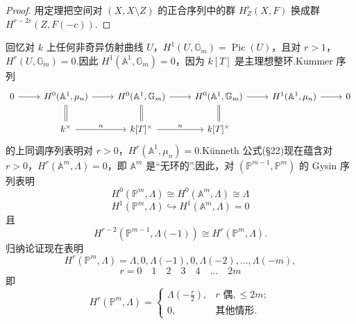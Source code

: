 \begin{proof}
用定理把空间对 $(X, X \setminus Z)$ 的正合序列中的群 $H^{r}_{Z}(X, F)$ 换成群 $H^{r-2c}(Z, F(-c))$.
\end{proof}

\begin{example}\label{ex:16.3}
回忆对 $k$ 上任何非奇异仿射曲线 $U$，$H^{1}(U, \mathbb{G}_{m}) = \operatorname{Pic}(U)$，且对 $r > 1$，$H^{r}(U, \mathbb{G}_{m}) = 0$.因此 $H^{1}(\mathbb{A}^{1}, \mathbb{G}_{m}) = 0$，因为 $k[T]$ 是主理想整环.Kummer 序列
\[
\begin{tikzcd}
0 \arrow[r] & H^{0}(\mathbb{A}^{1}, \mu_n) \arrow[r] \arrow[d, equal] & H^{0}(\mathbb{A}^{1}, \mathbb{G}_{m}) \arrow[r] \arrow[d, equal] & H^{0}(\mathbb{A}^{1}, \mathbb{G}_{m}) \arrow[r] \arrow[d, equal] & H^{1}(\mathbb{A}^{1}, \mu_n) \arrow[r] & 0 \\
& k^{\times} \arrow[r, "n"] & k[T]^{\times} \arrow[r, "n"] & k[T]^{\times} &
\end{tikzcd}
\]
的上同调序列表明对 $r > 0$，$H^{r}(\mathbb{A}^{1}, \mu_n) = 0$.K\"unneth 公式(\S 22)现在蕴含对 $r > 0$，$H^{r}(\mathbb{A}^{m}, \Lambda) = 0$，即 $\mathbb{A}^{m}$ 是``无环的''.因此，对 $(\mathbb{P}^{m-1}, \mathbb{P}^{m})$ 的 Gysin 序列表明
\[
H^{0}(\mathbb{P}^{m}, \Lambda) \cong H^{0}(\mathbb{A}^{m}, \Lambda) \cong \Lambda
\]
\[
H^{1}(\mathbb{P}^{m}, \Lambda) \hookrightarrow H^{1}(\mathbb{A}^{m}, \Lambda) = 0
\]
且
\[
H^{r-2}(\mathbb{P}^{m-1}, \Lambda(-1)) \cong H^{r}(\mathbb{P}^{m}, \Lambda).
\]
归纳论证现在表明
\[
H^{r}(\mathbb{P}^{m}, \Lambda) = \Lambda, 0, \Lambda(-1), 0, \Lambda(-2), \ldots, \Lambda(-m),
\]
\[
r = 0 \quad 1 \quad 2 \quad 3 \quad 4 \quad \ldots \quad 2m
\]
即
\[
H^{r}(\mathbb{P}^{m}, \Lambda) = \begin{cases}
\Lambda(-\frac{r}{2}), & r \text{ 偶}, \leq 2m;\\
0, & \text{其他情形}.
\end{cases}
\]
\end{example}

